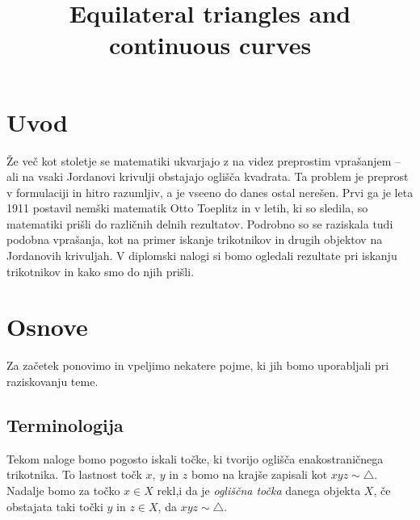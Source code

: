 \documentclass[mat1]{fmfdelo}
\title{Equilateral triangles and continuous curves}
\begin{document}
\section{Uvod}
Že več kot stoletje se matematiki ukvarjajo z na videz preprostim vprašanjem -- ali na vsaki Jordanovi krivulji obstajajo oglišča kvadrata. Ta problem je preprost v formulaciji in hitro razumljiv, a je vseeno do danes ostal nerešen. Prvi ga je leta 1911 postavil nemški matematik Otto Toeplitz \cite{splet_idaho} in v letih, ki so sledila, so matematiki prišli do različnih delnih rezultatov. Podrobno so se raziskala tudi podobna vprašanja, kot na primer iskanje trikotnikov in drugih objektov na Jordanovih krivuljah. V diplomski nalogi si bomo ogledali rezultate pri iskanju trikotnikov in kako smo do njih prišli.

\section{Osnove}

Za začetek ponovimo in vpeljimo nekatere pojme, ki jih bomo uporabljali pri raziskovanju teme.

\subsection{Terminologija}

Tekom naloge bomo pogosto iskali točke, ki tvorijo oglišča enakostraničnega trikotnika. To lastnost točk $x,\ y$ in $z$ bomo na krajše zapisali kot $xyz \sim \triangle$. Nadalje bomo za točko $x \in X$ rekl,i da je \emph{ogliščna točka} danega objekta $X$, če obstajata taki točki $y$ in $z \in X$, da $xyz \sim \triangle$.
\end{document}

